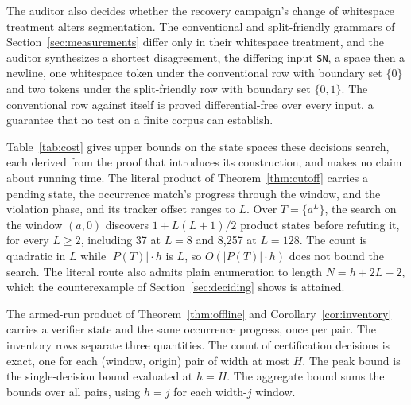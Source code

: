 \documentclass[11pt,a4paper]{article}
\theoremstyle{definition}
\theoremstyle{plain}
\newcommand{\code}[1]{\texttt{#1}}
\begin{document}
The auditor also decides whether the recovery campaign's change of whitespace treatment alters segmentation. The
conventional and split-friendly grammars of Section~\ref{sec:measurements} differ only in their whitespace treatment,
and the auditor synthesizes a shortest disagreement, the differing input \code{SN}, a space then a newline, one
whitespace token under the conventional row with boundary set $\{0\}$ and two tokens under the split-friendly row with
boundary set $\{0, 1\}$. The conventional row against itself is proved differential-free over every input, a guarantee
that no test on a finite corpus can establish.


Table~\ref{tab:cost} gives upper bounds on the state spaces these decisions search, each derived from the proof that
introduces its construction, and makes no claim about running time. The literal product of Theorem~\ref{thm:cutoff}
carries a pending state, the occurrence match's progress through the window, and the violation phase, and its tracker
offset ranges to $L$. Over $T = \{a^{L}\}$, the search on the window $(a, 0)$ discovers $1 + L(L + 1)/2$ product states
before refuting it, for every $L \ge 2$, including 37 at $L = 8$ and 8{,}257 at $L = 128$. The count is quadratic in $L$
while $|P(T)| \cdot h$ is $L$, so $O(|P(T)| \cdot h)$ does not bound the search. The literal route also admits plain
enumeration to length $N = h + 2L - 2$, which the counterexample of Section~\ref{sec:deciding} shows is attained.

The armed-run product of Theorem~\ref{thm:offline} and Corollary~\ref{cor:inventory} carries a verifier state and the
same occurrence progress, once per pair. The inventory rows separate three quantities. The count of certification
decisions is exact, one for each (window, origin) pair of width at most $H$. The peak bound is the single-decision bound
evaluated at $h = H$. The aggregate bound sums the bounds over all pairs, using $h = j$ for each width-$j$ window.
\end{document}
